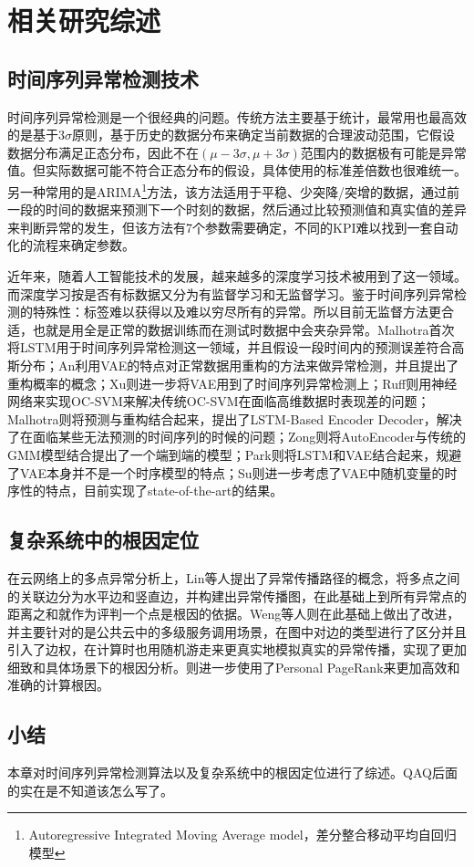 
\chapter{相关研究综述}
\label{cha:intro}
\section{时间序列异常检测技术}
时间序列异常检测是一个很经典的问题。传统方法主要基于统计，最常用也最高效的是基于3$\sigma$原则，基于历史的数据分布来确定当前数据的合理波动范围，它假设数据分布满足正态分布，因此不在$(\mu - 3\sigma,\mu + 3\sigma)$范围内的数据极有可能是异常值。但实际数据可能不符合正态分布的假设，具体使用的标准差倍数也很难统一。另一种常用的是ARIMA\footnote{Autoregressive Integrated Moving Average model，差分整合移动平均自回归模型}方法，该方法适用于平稳、少突降/突增的数据，通过前一段的时间的数据来预测下一个时刻的数据，然后通过比较预测值和真实值的差异来判断异常的发生，但该方法有7个参数需要确定，不同的KPI难以找到一套自动化的流程来确定参数。

近年来，随着人工智能技术的发展，越来越多的深度学习技术被用到了这一领域。而深度学习按是否有标数据又分为有监督学习和无监督学习。鉴于时间序列异常检测的特殊性：标签难以获得以及难以穷尽所有的异常。所以目前无监督方法更合适，也就是用全是正常的数据训练而在测试时数据中会夹杂异常。Malhotra\cite{malhotra2015long}首次将LSTM用于时间序列异常检测这一领域，并且假设一段时间内的预测误差符合高斯分布；An\cite{an2015variational}利用VAE的特点对正常数据用重构的方法来做异常检测，并且提出了重构概率的概念；Xu\cite{xu2018unsupervised}则进一步将VAE用到了时间序列异常检测上；Ruff\cite{ruff2018deep}则用神经网络来实现OC-SVM来解决传统OC-SVM在面临高维数据时表现差的问题；Malhotra\cite{malhotra2016lstm}则将预测与重构结合起来，提出了LSTM-Based Encoder Decoder，解决了在面临某些无法预测的时间序列的时候的问题；Zong\cite{zong2018deep}则将AutoEncoder与传统的GMM模型结合提出了一个端到端的模型；Park\cite{park2018multimodal}则将LSTM和VAE结合起来，规避了VAE本身并不是一个时序模型的特点；Su\cite{su2019robust}则进一步考虑了VAE中随机变量的时序性的特点，目前实现了state-of-the-art的结果。

\section{复杂系统中的根因定位}

在云网络上的多点异常分析上，Lin\cite{lin2016automated}等人提出了异常传播路径的概念，将多点之间的关联边分为水平边和竖直边，并构建出异常传播图，在此基础上到所有异常点的距离之和就作为评判一个点是根因的依据。Weng\cite{weng2018root}等人则在此基础上做出了改进，并主要针对的是公共云中的多级服务调用场景，在图中对边的类型进行了区分并且引入了边权，在计算时也用随机游走来更真实地模拟真实的异常传播，实现了更加细致和具体场景下的根因分析。\cite{wu2020microrca}则进一步使用了Personal PageRank来更加高效和准确的计算根因。
\section{小结}
本章对时间序列异常检测算法以及复杂系统中的根因定位进行了综述。QAQ后面的实在是不知道该怎么写了。

